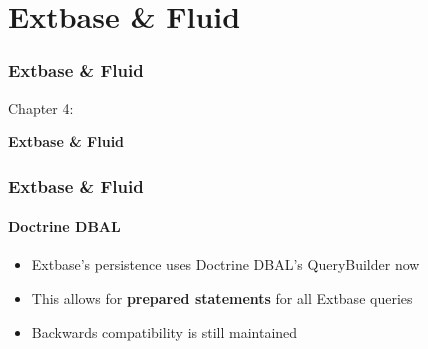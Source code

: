 %

\section{Extbase \& Fluid}
\begin{frame}[fragile]
	\frametitle{Extbase \& Fluid}

	\begin{center}\huge{Chapter 4:}\end{center}
	\begin{center}\huge{\color{typo3darkgrey}\textbf{Extbase \& Fluid}}\end{center}

\end{frame}


\begin{frame}[fragile]
	\frametitle{Extbase \& Fluid}
	\framesubtitle{Doctrine DBAL}

	\begin{itemize}

		\item Extbase's persistence uses Doctrine DBAL's QueryBuilder now
		\item This allows for \textbf{prepared statements} for all Extbase queries
		\item Backwards compatibility is still maintained

	\end{itemize}

\end{frame}



